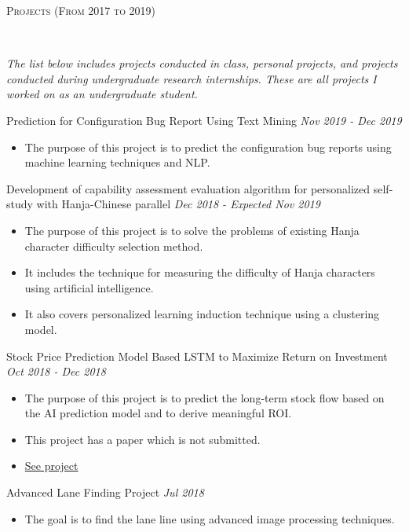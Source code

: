 \documentclass[10pt]{article}
\newenvironment{changemargin}[2]{
  \begin{list}{}{
    \setlength{\topsep}{0pt}
    \setlength{\leftmargin}{#1}
    \setlength{\rightmargin}{#2}
    \setlength{\listparindent}{\parindent}
    \setlength{\itemindent}{\parindent}
    \setlength{\parsep}{\parskip}
  }
  \item[]}{\end{list}
}
\newcommand{\lineover}{
	\begin{changemargin}{-0.05in}{-0.05in}
		\vspace*{-8pt}
		\hrulefill \\
		\vspace*{-2pt}
	\end{changemargin}
}
\newcommand{\header}[1]{
	\begin{changemargin}{-0.5in}{-0.5in}
		\scshape{#1}\\
  	\lineover
	\end{changemargin}
}
\newcommand{\project}[2]{
	{#1} \hfill \emph{#2}\\ \medskip
}
\newenvironment{body} {
	\vspace*{-16pt}
	\begin{changemargin}{-0.25in}{-0.5in}
  }
	{\end{changemargin}
}
\begin{document}
\header{Projects (From 2017 to 2019)}
\begin{body}
	\vspace{14pt}
\textit{The list below includes projects conducted in class, personal projects, and projects conducted during undergraduate research internships. These are all projects I worked on as an undergraduate student.}\\
	\vspace{14pt}
\project{Prediction for Configuration Bug Report Using Text Mining}{Nov 2019 - Dec 2019}
\begin{itemize} \itemsep -0pt  %
      \item  The purpose of this project is to predict the configuration bug reports using machine learning techniques and NLP.
  	\end{itemize}
\project{Development of capability assessment evaluation algorithm for personalized self-study with Hanja-Chinese parallel}{Dec 2018 - Expected Nov 2019}
\begin{itemize} \itemsep -0pt  %
      \item  The purpose of this project is to solve the problems of existing Hanja character difficulty selection method.
      \item It includes the technique for measuring the difficulty of Hanja characters using artificial intelligence.
      \item It also covers personalized learning induction technique using a clustering model.
  	\end{itemize}
\project{Stock Price Prediction Model Based LSTM to Maximize Return on Investment}{Oct 2018 - Dec 2018}
\begin{itemize} \itemsep -0pt  %
      \item  The purpose of this project is to predict the long-term stock flow based on the AI prediction model and to derive meaningful ROI.
      \item This project has a paper which is not submitted.
      \item \href{https://drive.google.com/file/d/1Fp3WmoBpHpYU13fNWS1vbQSzmBCR3MIu/view}{See project}
  	\end{itemize}
\project{Advanced Lane Finding Project}{Jul 2018}
\begin{itemize} \itemsep -0pt  %
      \item  The goal is to find the lane line using advanced image processing techniques.

\end{itemize}
\end{body}
\end{document}
